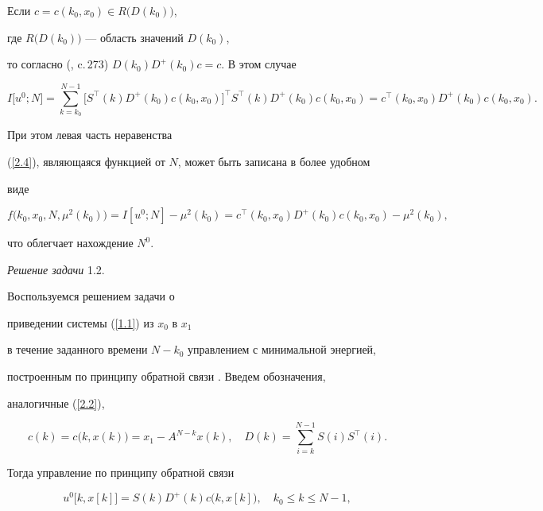 \begin{notes}


Если $c=c(k_0, x_0)\in R\bigl(D(k_0)\bigr)$,


где $R\bigl(D(k_0)\bigr)$ --- область значений $D(k_0)$,


то согласно (\cite{Lank}, c.\,273) $D(k_0) D^+(k_0) c=c$. В этом случае


$$


I\bigl[u^0; N\bigr]


=\sum_{k=k_0}^{N-1}\bigl[S^{\top}(k)D^+(k_0) c(k_0, x_0)\bigr]^{\top}


S^{\top}(k)D^+(k_0) c(k_0, x_0)=


c^{\top}(k_0, x_0) D^+(k_0) c(k_0, x_0).


$$


При этом левая часть неравенства


(\ref{2.4}), являющаяся функцией от $N$, может быть записана в более удобном


виде


$$


f\bigl(k_0, x_0, N, \mu^2(k_0)\bigr)=I[u^0; N]-\mu^2(k_0)=


c^{\top}(k_0, x_0) D^+(k_0) c(k_0, x_0)-\mu^2(k_0),


$$


что облегчает нахождение $N^0$.


\end{notes}





{\it Решение задачи} 1.2.


Воспользуемся решением задачи о 


приведении системы (\ref{1.1}) из $x_0$ в $x_1$


в течение заданного времени $N-k_0$ управлением с минимальной энергией,


построенным по принципу обратной связи \cite{2}. Введем обозначения,


аналогичные (\ref{2.2}),


\begin{equation}\label{2.5}


c(k)=c\bigl(k, x(k)\bigr)=x_1 - A^{N-k}x(k),\quad D(k)=


\sum_{i=k}^{N-1}S(i) S^{\top}(i) .


\end{equation}


Тогда управление по принципу обратной связи


\begin{equation}\label{2.6}


u^0\bigl[k, x[k]\bigr]=S(k)D^+(k)c\bigl(k, x[k]\bigr), \quad k_0\le k\le N-1,


\end{equation}


